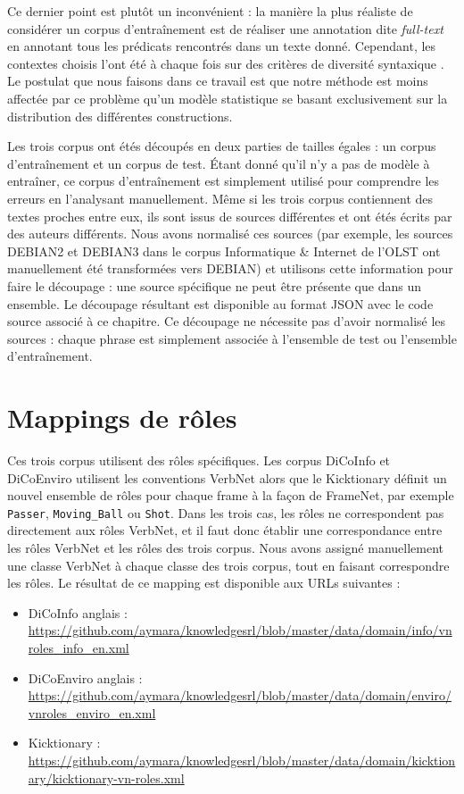 Ce dernier point est plutôt un inconvénient : la manière la plus réaliste de
considérer un corpus d'entraînement est de réaliser une annotation dite
\textit{full-text} en annotant tous les prédicats rencontrés dans un texte
donné. Cependant, les contextes choisis l'ont été à chaque fois sur des
critères de diversité syntaxique
\citep{schmidt2006interfacing,lhomme2012adding}. Le postulat que nous faisons
dans ce travail est que notre méthode est moins affectée par ce problème qu'un
modèle statistique se basant exclusivement sur la distribution des différentes
constructions.

Les trois corpus ont étés découpés en deux parties de tailles égales : un
corpus d'entraînement et un corpus de test. Étant donné qu'il n'y a pas de
modèle à entraîner, ce corpus d'entraînement est simplement utilisé pour
comprendre les erreurs en l'analysant manuellement. Même si les trois corpus
contiennent des textes proches entre eux, ils sont issus de sources différentes
et ont étés écrits par des auteurs différents. Nous avons normalisé ces sources
(par exemple, les sources DEBIAN2 et DEBIAN3 dans le corpus Informatique \&
Internet de l'OLST ont manuellement été transformées vers DEBIAN) et utilisons
cette information pour faire le découpage : une source spécifique ne peut être
présente que dans un ensemble. Le découpage résultant est disponible au format
JSON avec le code source associé à ce chapitre. Ce découpage ne nécessite pas
d'avoir normalisé les sources : chaque phrase est simplement associée à
l'ensemble de test ou l'ensemble d'entraînement.

\section{Mappings de rôles}
\label{mapping}

Ces trois corpus utilisent des rôles spécifiques. Les corpus DiCoInfo et
DiCoEnviro utilisent les conventions VerbNet alors que le Kicktionary  définit
un nouvel ensemble de rôles pour chaque frame à la façon de FrameNet, par
exemple \texttt{Passer}, \texttt{Moving\_Ball} ou \texttt{Shot}. Dans les trois
cas, les rôles ne correspondent pas directement aux rôles VerbNet, et il faut
donc établir une correspondance entre les rôles VerbNet et les rôles des trois
corpus.  Nous avons assigné manuellement une classe VerbNet à chaque classe des
trois corpus, tout en faisant correspondre les rôles. Le résultat de ce mapping
est disponible aux URLs suivantes :

\begin{itemize}
    \item DiCoInfo anglais : \url{https://github.com/aymara/knowledgesrl/blob/master/data/domain/info/vnroles_info_en.xml}
    \item DiCoEnviro anglais : \url{https://github.com/aymara/knowledgesrl/blob/master/data/domain/enviro/vnroles_enviro_en.xml}
    \item Kicktionary : \url{https://github.com/aymara/knowledgesrl/blob/master/data/domain/kicktionary/kicktionary-vn-roles.xml}
\end{itemize}

